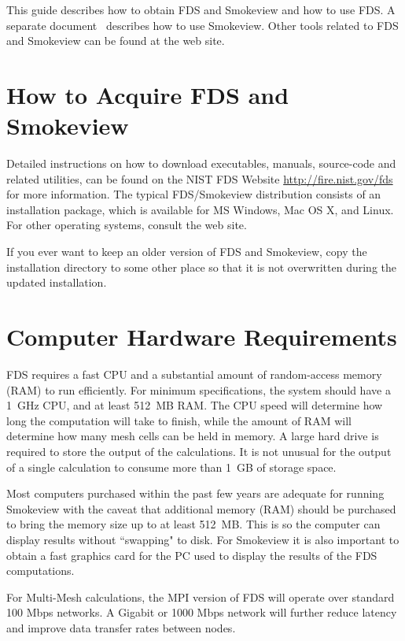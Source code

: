 \documentclass[11pt]{book}
\begin{document}
This guide describes how to obtain FDS and Smokeview and how to use FDS.
A separate document~\cite{Smokeview_Users_Guide_5} describes how to use Smokeview. Other tools related to
FDS and Smokeview can be found at the web site.

\section{How to Acquire FDS and Smokeview}
\label{info:sfcvs}

Detailed instructions on how to download executables, manuals, source-code and related utilities,
can be found on the NIST FDS Website
\href{http://fire.nist.gov/fds}{{\ct http://fire.nist.gov/fds}} for more information.
The typical FDS/Smokeview distribution consists of an installation package, which is available
for MS Windows, Mac OS X, and Linux.  For other operating systems, consult the web site.

\begin{warning}
\noindent
If you ever want to keep an older version of FDS and Smokeview, copy the installation directory to some other
place so that it is not overwritten during the updated installation.
\end{warning}

\section{Computer Hardware Requirements}

FDS requires a fast CPU and a substantial amount of random-access memory (RAM) to run efficiently.
For minimum specifications, the system should have a 1~GHz CPU, and at least 512~MB RAM.
The CPU speed will determine how long the computation will take to finish, while the amount
of RAM will determine how many mesh cells can be held in memory.
A large hard drive is required to store the output of the calculations. It is not unusual for
the output of a single calculation to consume more than 1~GB of storage space.

Most computers purchased within the past few years are adequate for running Smokeview
with the caveat that additional memory (RAM) should be purchased to bring the
memory size up to at least 512~MB. This is so the computer can display results without
``swapping" to disk. For Smokeview it is also important to obtain a fast graphics card
for the PC used to display the results of the FDS computations.

For Multi-Mesh calculations, the MPI version of FDS will operate over standard 100 Mbps networks.
A Gigabit or 1000 Mbps network will further reduce latency and improve data transfer rates between nodes.
\end{document}
